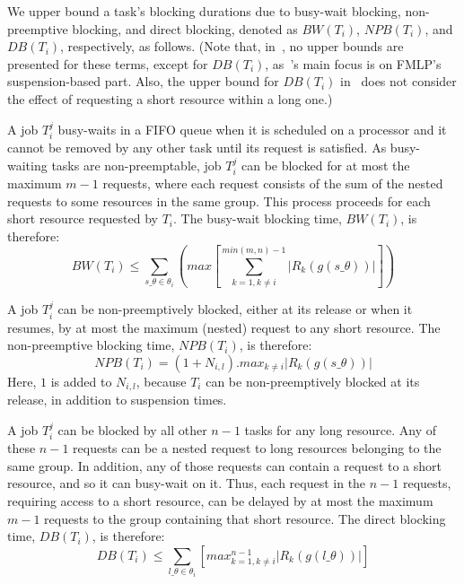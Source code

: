 \documentclass[a4paper,english]{article}
\begin{document}
We upper bound a task's blocking durations due to busy-wait blocking, non-preemptive blocking, and direct blocking, denoted as $BW(T_{i})$, $NPB(T_{i})$, and $DB(T_{i})$, respectively, as follows.  
(Note that, in~\cite{key-3}, no upper bounds are presented for these terms, except for $DB(T_{i})$, as~\cite{key-3}'s main focus is on FMLP's suspension-based part. Also, the upper bound for $DB(T_{i})$ in~\cite{key-3} does not consider the effect of requesting a short resource within a long one.)


A job $T_{i}^{j}$ busy-waits in a FIFO queue when it is scheduled on a processor and it cannot be removed by any other task until its request is satisfied. As busy-waiting tasks are non-preemptable, job $T_{i}^{j}$ can be blocked for at most the maximum $m-1$ requests, where each request consists of the sum of the nested requests
to some resources in the same group. This process proceeds for each short resource requested by $T_{i}$. The busy-wait blocking time, $BW(T_{i})$, is therefore:
\begin{equation}
BW(T_{i})\le\sum_{s\_\theta\in\theta_{i}} \left(max \left[\sum_{k=1,k\ne i}^{min(m,n)-1} \left| R_{k} \left(g \left(s\_\theta \right) \right) \right| \right] \right)\label{eq26}
\end{equation}

A job $T_{i}^{j}$ can be non-preemptively blocked, either at its release or when it resumes, by at most the maximum (nested) request to any short resource. The non-preemptive blocking time, $NPB(T_{i})$, is therefore:
\begin{equation}
NPB(T_{i})=(1+N_{i,l}).max_{k\ne i} \left| R_{k}(g(s\_\theta)) \right|\label{eq27}
\end{equation}
Here, $1$ is added to $N_{i,l}$, because $T_{i}$ can be non-preemptively blocked at its release, in addition to suspension times. 

A job $T_{i}^{j}$ can be blocked by all other $n-1$ tasks for any long resource. Any of these $n-1$ requests can be a nested request to long resources belonging to the same group. In addition, any of those requests can contain a request to a short resource, and so it can busy-wait on it. Thus, each request in the $n-1$ requests, requiring access to a short resource, can be delayed by at most the maximum $m-1$ requests to the group containing that short resource. The direct blocking time, $DB(T_{i})$, is therefore:
\begin{equation}
DB(T_{i})\le\sum_{l\_\theta\in\theta_{i}} \left[max_{k=1,k\ne i}^{n-1} \left|R_{k} \left(g \left(l\_\theta \right) \right) \right| \right]
\label{eq28}
\end{equation}
\end{document}

